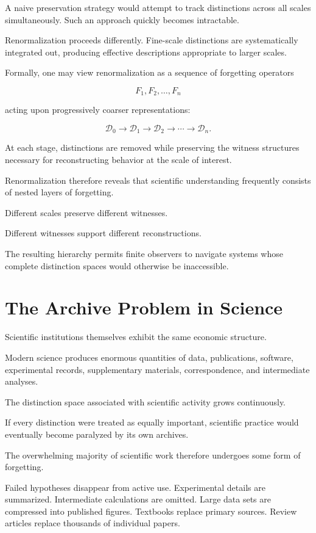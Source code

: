 \documentclass[12pt,oneside]{book}
\theoremstyle{plain} \newtheorem{theorem}{Theorem}[chapter] \newtheorem{lemma}[theorem]{Lemma} \newtheorem{proposition}[theorem]{Proposition} \newtheorem{corollary}[theorem]{Corollary}
\theoremstyle{definition} \newtheorem{definition}[theorem]{Definition} \newtheorem{axiom}[theorem]{Axiom} \newtheorem{construction}[theorem]{Construction}
\theoremstyle{remark} \newtheorem{remark}[theorem]{Remark} \newtheorem{example}[theorem]{Example}
\newcommand{\D}{\mathcal{D}} \newcommand{\R}{\mathcal{R}} \newcommand{\F}{\mathcal{F}} \newcommand{\U}{\mathcal{U}} \newcommand{\M}{\mathcal{M}} \newcommand{\G}{\Gamma}
\begin{document}
A naive preservation strategy would attempt to track distinctions across all scales simultaneously. Such an approach quickly becomes intractable.

Renormalization proceeds differently. Fine-scale distinctions are systematically integrated out, producing effective descriptions appropriate to larger scales.

Formally, one may view renormalization as a sequence of forgetting operators

\[
F_1,F_2,\ldots,F_n
\]

acting upon progressively coarser representations:

\[
\D_0
\rightarrow
\D_1
\rightarrow
\D_2
\rightarrow
\cdots
\rightarrow
\D_n.
\]

At each stage, distinctions are removed while preserving the witness structures necessary for reconstructing behavior at the scale of interest.

Renormalization therefore reveals that scientific understanding frequently consists of nested layers of forgetting.

Different scales preserve different witnesses.

Different witnesses support different reconstructions.

The resulting hierarchy permits finite observers to navigate systems whose complete distinction spaces would otherwise be inaccessible.

\section{The Archive Problem in Science}

Scientific institutions themselves exhibit the same economic structure.

Modern science produces enormous quantities of data, publications, software, experimental records, supplementary materials, correspondence, and intermediate analyses.

The distinction space associated with scientific activity grows continuously.

If every distinction were treated as equally important, scientific practice would eventually become paralyzed by its own archives.

The overwhelming majority of scientific work therefore undergoes some form of forgetting.

Failed hypotheses disappear from active use. Experimental details are summarized. Intermediate calculations are omitted. Large data sets are compressed into published figures. Textbooks replace primary sources. Review articles replace thousands of individual papers.
\end{document}
